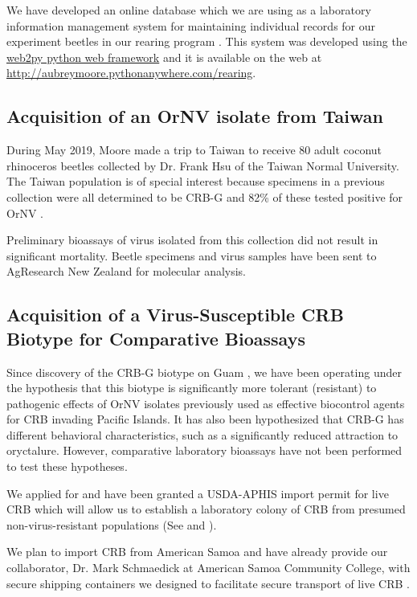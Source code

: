 \documentclass[12pt,letterpaper,english,bibliography=totocnumbered]{scrartcl}
\begin{document}
We have developed an online database which we are using as a laboratory information management system for maintaining individual records for our experiment beetles in our rearing program \cite{moore_coconut_2019-1}. This system was developed using the \href{http://www.web2py.com/}{web2py python web framework} and it is available on the web at \url{http://aubreymoore.pythonanywhere.com/rearing}. 

\subsection{Acquisition of an OrNV isolate from Taiwan}

During May 2019, Moore made a trip to Taiwan to receive 80 adult coconut rhinoceros
beetles collected by Dr. Frank Hsu of the Taiwan Normal University. The Taiwan population is of special interest because specimens in a previous collection
were all determined to be CRB-G and 82\% of these tested positive for OrNV \cite{watanabe_survey_2016-1}.

Preliminary bioassays of virus isolated from this collection did not result in significant mortality. Beetle specimens and virus samples have been sent to AgResearch New Zealand for molecular analysis.

\subsection{Acquisition of a Virus-Susceptible CRB Biotype for Comparative Bioassays}

Since discovery of the CRB-G biotype on Guam \cite{marshall_new_2017-1}, we have been operating under the hypothesis that this biotype is significantly more tolerant (resistant) to pathogenic effects of OrNV isolates previously used as effective biocontrol agents for CRB invading Pacific Islands. It has also been hypothesized that CRB-G has different behavioral characteristics, such as a significantly reduced attraction to oryctalure. However, comparative laboratory bioassays have not been performed to test these hypotheses.

We applied for and have been granted a USDA-APHIS import permit for live CRB which will allow us to establish a laboratory colony of CRB from presumed non-virus-resistant populations (See \cite{moore_additional_2019} and \cite{usda-aphis_crb_2019}). 

We plan to import CRB from American Samoa and have already provide our collaborator, Dr. Mark Schmaedick at American Samoa Community College, with secure shipping containers we designed to facilitate secure transport of live CRB \cite{moore_container_2017-1}.
\end{document}
